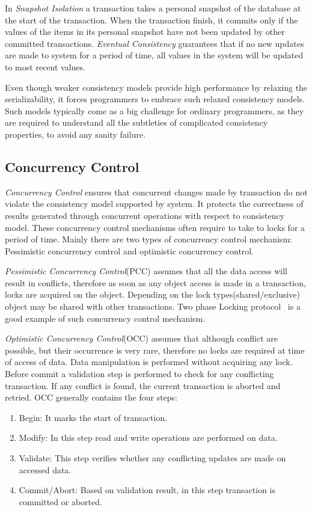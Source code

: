 \documentclass[12pt,english]{report}
\begin{document}
In \textit{Snapshot Isolation} a transaction takes a personal snapshot of the database at the start of the transaction. When the transaction finish, it commits only if the values of the items in its personal snapshot have not been updated by other committed transactions. \textit{Eventual Consistency} guarantees that if no new updates are made to system for a period of time, all values in the system will be updated to most recent values.

Even though weaker consistency models provide high performance by relaxing the serializability, it forces programmers to embrace such relaxed consistency models. Such models typically come as a big challenge for ordinary programmers, as they are required to understand all the subtleties of complicated consistency properties, to avoid any sanity failure.

\subsection{Concurrency Control} 

\textit{Concurrency Control} ensures that concurrent changes made by transaction do not violate the consistency model supported by system. It protects the correctness of results generated through concurrent operations with respect to consistency model. These concurrency control mechanisms often require to take to locks for a period of time. Mainly there are two types of concurrency control mechanism: Pessimistic concurrency control and optimistic concurrency control.

\textit{Pessimistic Concurrency Control}(PCC) assumes that all the data access will result in conflicts, therefore as soon as any object access is made in a transaction, locks are acquired on the object. Depending on the lock types(shared/exclusive) object may be shared with other transactions. Two phase Locking protocol~\cite{2PL:lin1983basic} is a good example of such concurrency control mechanism.  

\textit{Optimistic Concurrency Control}(OCC) assumes that although conflict are possible, but their occurrence is very rare, therefore no locks are required at time of access of data. Data manipulation is performed without acquiring any lock. Before commit a validation step is performed to check for any conflicting transaction. If any conflict is found, the current transaction is aborted and retried. OCC generally contains the four steps:

\begin{enumerate}
\item Begin: It marks the start of transaction.
\item Modify: In this step read and write operations are performed on data.
\item Validate: This step verifies whether any conflicting updates are made on accessed data.
\item Commit/Abort: Based on validation result, in this step transaction is committed or aborted.
\end{enumerate}   
\end{document}
